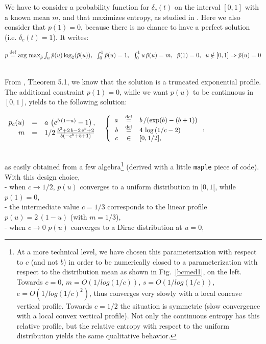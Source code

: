 \documentclass{article}
\newcommand{\deq}{\stackrel {\rm def}{=}}
\newcommand{\eqline}[1]{\\\centerline{$#1$}\\}
\begin{document}
We have to consider a probability function for $\delta_c(t)$ on the interval $[0, 1]$ with a known mean $m$, and that maximizes entropy, as studied in \cite{conrad2004probability}. Here we also consider that $p(1) = 0$, because there is no chance to have a perfect solution (i.e. $\delta_c(t)=1$). It writes:
\eqline{p \deq \mbox{arg max}_{\hat{p}} \int_u {\hat{p}}(u) \log_2({\hat{p}}(u)), \;\; \int_0^1 {\hat{p}}(u) = 1, \;\; \int_0^1 u \, {\hat{p}}(u) = m, \;\; {\hat{p}}(1) = 0, \;\; u \notin [0, 1] \Rightarrow {\hat{p}}(u) = 0}
From \cite{conrad2004probability}, Theorem 5.1, we know that the solution is a truncated exponential profile. The additional constraint $p(1) = 0$, while we want $p(u)$ to be continuous in $[0, 1]$,  yields to the following solution:
\eqline{\begin{array}{rcl} 
p_c(u) &=& a \, \left(e^{b \, (1 - u)} - 1\right), \\
m&=&1/2\,{\frac {{b}^{2}+2\,b-2\,{{\rm e}^{b}}+2}{b \left( -{{\rm e}^{b}}+b+1 \right)}} \\ 
\end{array} \;\;\; {\small \left\{ \begin{array}{rcl} a &\deq& b \left/ \left(\exp(b) - (b + 1)\right) \right. \\ b &\deq& 4 \, \log\left( 1 / c - 2\right) \\ c &\in& [0, 1/2], \\ \end{array} \right.},}
as easily obtained from a few algebra\footnote{At a more technical level, we have chosen this parameterization with respect to $c$ (and not $b$) in order to be numerically closed to a parameterization with respect to the distribution mean as shown in Fig.~\ref{bcmed1}, on the left. Towards $c = 0$, $m = O(1/log(1/c))$, $s = O(1/log(1/c))$, $e = O(1/log(1/c)^2)$, thus converges very slowly with a local concave vertical profile. Towards $c=1/2$ the situation is symmetric (slow convergence with a local convex vertical profile). Not only the continuous entropy has this relative profile, but the relative entropy with respect to the uniform distribution yields the same qualitative behavior.} (derived with a little {\tt maple} piece of code). With this design choice,
\\- when $c \rightarrow 1/2$, $p(u)$ converges to a uniform distribution in $[0, 1[$, while $p(1) = 0$,
\\- the intermediate value $c = 1/3 $ corresponds to the linear profile $p(u) = 2 \, (1 - u)$ (with $m = 1/3$), 
\\ - when $c \rightarrow 0$ $p(u)$ converges to a Dirac distribution at $u = 0$,
\end{document}
